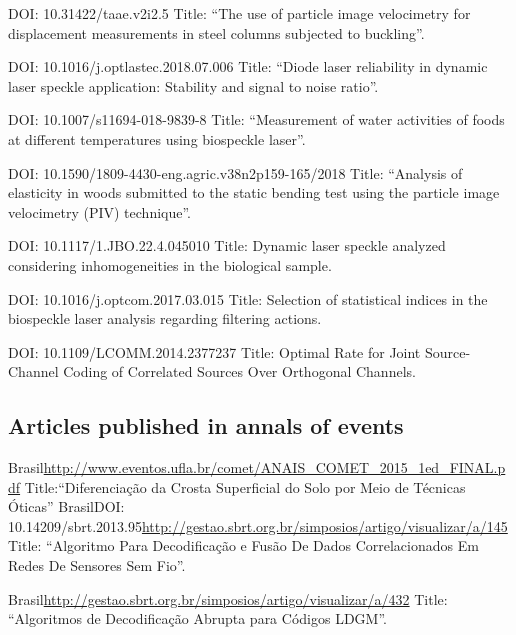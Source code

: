 \documentclass[11pt,a4paper,sans]{moderncv} %
\begin{document}
	      {DOI: 10.31422/taae.v2i2.5}{}{}
	      {Title: ``The use of particle image velocimetry for displacement measurements in steel columns subjected to buckling''.}
	      
	      {DOI: 10.1016/j.optlastec.2018.07.006}{}{}
	      {Title: ``Diode laser reliability in dynamic laser speckle application: Stability and signal to noise ratio''.}
	      
	      {DOI: 10.1007/s11694-018-9839-8}{}{}
	      {Title: ``Measurement of water activities of foods at different temperatures using biospeckle laser''.}

	      {DOI: 10.1590/1809-4430-eng.agric.v38n2p159-165/2018}{}{}
	      {Title: ``Analysis of elasticity in woods submitted to the static bending test using the particle image velocimetry (PIV) technique''.}

	      {DOI: 10.1117/1.JBO.22.4.045010}{}{}
	      {Title: Dynamic laser speckle analyzed considering inhomogeneities in the biological sample.}
	      
	      {DOI: 10.1016/j.optcom.2017.03.015}{}{}
	      {Title: Selection of statistical indices in the biospeckle laser analysis regarding filtering actions.}
	      
	      {DOI: 10.1109/LCOMM.2014.2377237}{}{}
	      {Title: Optimal  Rate for Joint Source-Channel Coding of Correlated Sources Over Orthogonal Channels.}

\subsection{Articles published in annals of events}
	      {Brasil}{}{\url{http://www.eventos.ufla.br/comet/ANAIS\_COMET\_2015\_1ed\_FINAL.pdf}}
	      {Title:``Diferenciação da Crosta Superficial do Solo por Meio de Técnicas Óticas''}
	      {Brasil}{DOI: 10.14209/sbrt.2013.95}{\url{http://gestao.sbrt.org.br/simposios/artigo/visualizar/a/145}}
	      {Title: ``Algoritmo Para Decodificação e Fusão De Dados Correlacionados Em Redes De Sensores Sem Fio''.}

	      {Brasil}{}{\url{http://gestao.sbrt.org.br/simposios/artigo/visualizar/a/432}}
	      {Title: ``Algoritmos de Decodificação Abrupta para Códigos LDGM''.}
\end{document}
